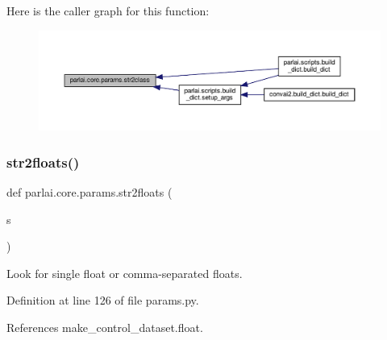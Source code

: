 Here is the caller graph for this function\+:
\nopagebreak
\begin{figure}[H]
\begin{center}
\leavevmode
\includegraphics[width=350pt]{namespaceparlai_1_1core_1_1params_aa6083a72ad328d26016bd5f805a0b1c8_icgraph}
\end{center}
\end{figure}
\mbox{\label{namespaceparlai_1_1core_1_1params_a3ef8c61c55a77674dd852c5b9f21e560}} 
\subsubsection{\texorpdfstring{str2floats()}{str2floats()}}
{\footnotesize\ttfamily def parlai.\+core.\+params.\+str2floats (\begin{DoxyParamCaption}\item[{}]{s }\end{DoxyParamCaption})}

\begin{DoxyVerb}Look for single float or comma-separated floats.\end{DoxyVerb}
 

Definition at line 126 of file params.\+py.



References make\+\_\+control\+\_\+dataset.\+float.

